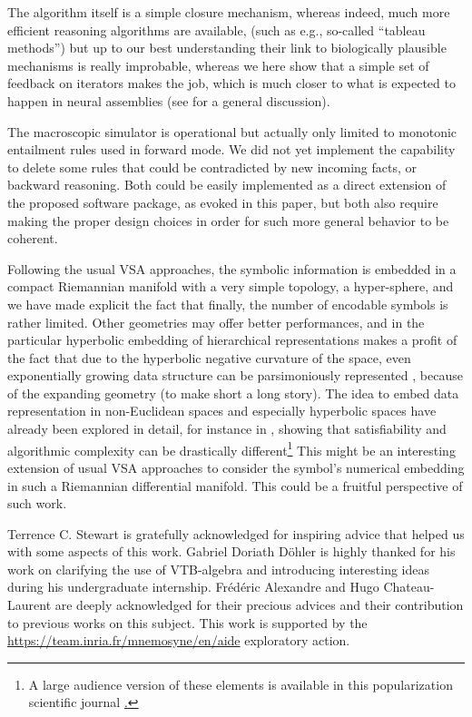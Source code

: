 \documentclass[sn-mathphys]{sn-jnl}
\begin{document}
The algorithm itself is a simple closure mechanism, whereas indeed, much more efficient reasoning algorithms are available, (such as e.g., so-called ``tableau methods'') but up to our best understanding their link to biologically plausible mechanisms is really improbable, whereas we here show that a simple set of feedback on iterators makes the job, which is much closer to what is expected to happen in neural assemblies (see \cite{eliasmith_how_2013} for a general discussion).

The macroscopic simulator is operational but actually only limited to monotonic entailment rules used in forward mode. We did not yet implement the capability to delete some rules that could be contradicted by new incoming facts, or backward reasoning. Both could be easily implemented as a direct extension of the proposed software package, as evoked in this paper, but both also require making the proper design choices in order for such more general behavior to be coherent.

Following the usual VSA approaches, the symbolic information is embedded in a compact Riemannian manifold with a very simple topology, a hyper-sphere, and we have made explicit the fact that finally, the number of encodable symbols is rather limited. Other geometries may offer better performances, and in the particular hyperbolic embedding of hierarchical representations makes a profit of the fact that due to the hyperbolic negative curvature of the space, even exponentially growing data structure can be parsimoniously represented \cite{nickel_poincare_2017}, because of the expanding geometry (to make short a long story). The idea to embed data representation in non-Euclidean spaces and especially hyperbolic spaces have already been explored in detail, for instance in \cite{delahaye_complexites_2006}, showing that satisfiability and algorithmic complexity can be drastically different\footnote{A large audience version of these elements is available in this popularization scientific journal \href{https://interstices.info/calculer-dans-un-monde-hyperbolique}.} This might be an interesting extension of usual VSA approaches to consider the symbol's numerical embedding in such a Riemannian differential manifold. This could be a fruitful perspective of such work.


\backmatter


Terrence C. Stewart is gratefully acknowledged for inspiring advice that helped us with some aspects of this work. Gabriel Doriath Döhler is highly thanked for his work on clarifying the use of VTB-algebra and introducing interesting ideas during his undergraduate internship. Frédéric Alexandre and Hugo Chateau-Laurent are deeply acknowledged for their precious advices and their contribution to previous works on this subject. This work is supported by the \href{Inria, AEx AIDE}{https://team.inria.fr/mnemosyne/en/aide} exploratory action.
\end{document}
